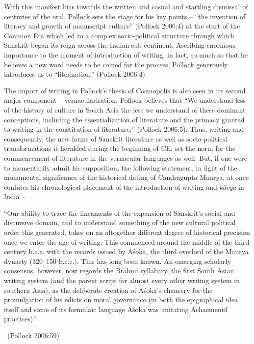  With this manifest bias towards the written and casual and startling dismissal of centuries of the oral, Pollock sets the stage for his key points – “the invention of literacy and growth of manuscript culture” (Pollock 2006:4) at the start of the Common Era which led to a complex socio-political structure through which Sanskrit began its reign across the Indian sub-continent. Ascribing enormous importance to the moment of introduction of writing, in fact, so much so that he believes a new word needs to be coined for the process, Pollock generously introduces us to “literization.” (Pollock 2006:4)


The import of writing in Pollock’s thesis of Cosmopolis is also seen in its second major component – vernacularisation. Pollock believes that “We understand less of the history of culture in South Asia the less we understand of these dominant conceptions, including the essentialization of literature and the primacy granted to writing in the constitution of literature,” (Pollock 2006:5). Thus, writing and consequently, the new forms of Sanskrit literature as well as socio-political transformations it heralded during the beginning of CE, set the norm for the commencement of literature in the vernacular languages as well. But, if one were to momentarily admit his supposition, the following statement, in light of the monumental significance of the historical dating of Candragupta Maurya, at once confutes his chronological placement of the introduction of writing and \textit{kāvya} in India –

\begin{myquote}
“Our ability to trace the lineaments of the expansion of Sanskrit’s social and discursive domain, and to understand something of the new cultural political order this generated, takes on an altogether different degree of historical precision once we enter the age of writing. This commenced around the middle of the third century b.c.e. with the records issued by Aśoka, the third overlord of the Maurya dynasty (320–150 b.c.e.). This has long been known. An emerging scholarly consensus, however, now regards the Brahmi syllabary, the first South Asian writing system (and the parent script for almost every other writing system in southern Asia), as the deliberate creation of Aśoka’s chancery for the promulgation of his edicts on moral governance (in both the epigraphical idea itself and some of its formulaic language Aśoka was imitating Achaemenid practices)” 

~\hfill (Pollock 2006:59)
\end{myquote}

